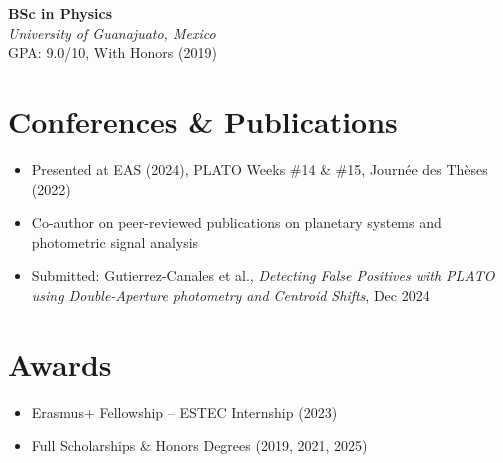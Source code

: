 \documentclass[10pt,a4paper]{article}
\begin{document}
\textbf{BSc in Physics} \\
\textit{University of Guanajuato, Mexico} \\
GPA: 9.0/10, With Honors (2019)

\section*{Conferences \& Publications}
\begin{itemize}[leftmargin=1.5em]
    \item Presented at EAS (2024), PLATO Weeks \#14 \& \#15, Journée des Thèses (2022)
    \item Co-author on peer-reviewed publications on planetary systems and photometric signal analysis
    \item Submitted: Gutierrez-Canales et al., \textit{Detecting False Positives with PLATO using Double-Aperture photometry and Centroid Shifts}, Dec 2024
\end{itemize}

\section*{Awards}
\begin{itemize}[leftmargin=1.5em]
    \item Erasmus+ Fellowship -- ESTEC Internship (2023)
    \item Full Scholarships \& Honors Degrees (2019, 2021, 2025)
\end{itemize}
\end{document}
